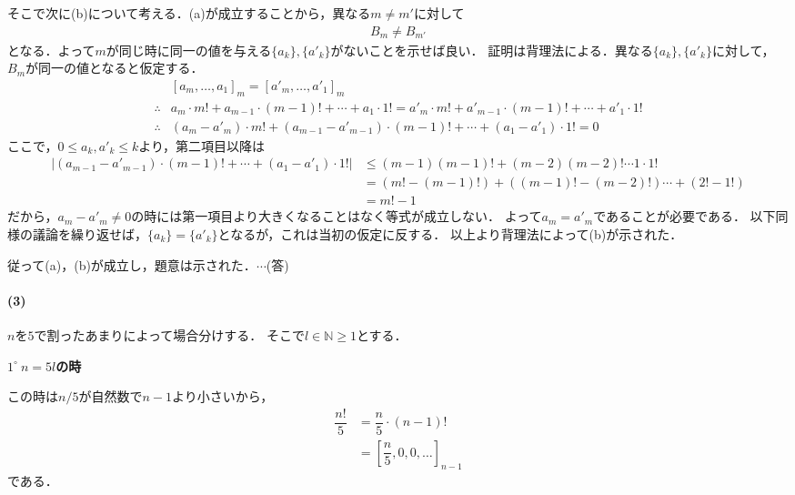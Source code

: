 \documentclass[../../main.tex]{subfiles}
\begin{document}
\begin{multicols}{2}
  そこで次に(b)について考える．(a)が成立することから，異なる$m\neq m'$に対して
  \begin{align}
    B_m \neq B_{m'}
  \end{align}
  となる．よって$m$が同じ時に同一の値を与える$\{a_k\}, \{a'_k\}$がないことを示せば良い．
  証明は背理法による．異なる$\{a_k\}, \{a'_k\}$に対して，$B_m$が同一の値となると仮定する．
  \begin{align}
    & [a_m, \dots, a_1]_m = [a'_m, \dots, a'_1]_m                                                                                   \\
    \therefore
    & a_m \cdot m! + a_{m-1} \cdot (m-1)! + \cdots + a_1 \cdot 1! =  a'_m \cdot m! + a'_{m-1} \cdot (m-1)! + \cdots + a'_1 \cdot 1! \\
    \therefore
    & (a_m-a'_m) \cdot m! + (a_{m-1}-a'_{m-1}) \cdot (m-1)! + \cdots + (a_1-a'_1) \cdot 1! = 0
  \end{align}
  ここで，$0 \le a_{k},a'_{k} \le k$より，第二項目以降は
  \begin{align}
    |(a_{m-1}-a'_{m-1}) \cdot (m-1)! + \cdots + (a_1-a'_1) \cdot 1!|
    & \le (m-1)(m-1)! + (m-2)(m-2)! \cdots 1\cdot 1!                                          \\
    & = \left(m! - (m-1)!\right) + \left((m-1)! - (m-2)!\right) \cdots + \left(2! - 1!\right) \\
    & = m! - 1
  \end{align}
  だから，$a_m-a'_m \neq 0$の時には第一項目より大きくなることはなく等式が成立しない．
  よって$a_m=a'_m$であることが必要である．
  以下同様の議論を繰り返せば，$\{a_k\} = \{a'_k\}$となるが，これは当初の仮定に反する．
  以上より背理法によって(b)が示された．

  従って(a)，(b)が成立し，題意は示された．$\cdots$(答)

  \paragraph{(3)}


  $n$を$5$で割ったあまりによって場合分けする．
  そこで$l \in \mathbb{N} \ge 1$とする．

  \textbf{$1^{\circ} \ n=5l$の時}

  この時は$n/5$が自然数で$n-1$より小さいから，
  \begin{align}
    \dfrac{n!}{5}
    & = \dfrac{n}{5}\cdot (n-1)!                     \\
    & = \left[\dfrac{n}{5}, 0, 0, \dots\right]_{n-1}
  \end{align}
  である．


\end{multicols}
\end{document}

